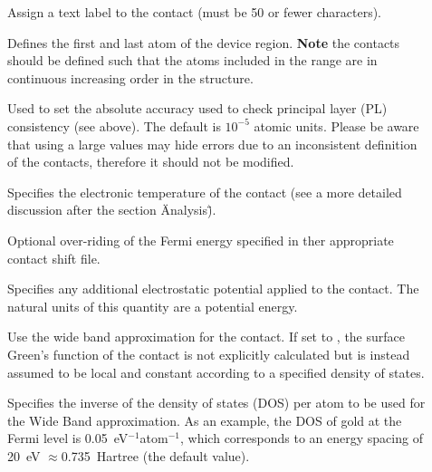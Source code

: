 \begin{description}
\item[] Assign a text label to the contact (must be 50 or fewer
  characters).
\item[]  Defines the first and last atom of the
  device region.  {\bf Note} the contacts should be defined such that the atoms
  included in the range are in continuous increasing order in the structure.
\item[] Used to set the absolute
  accuracy used to check principal layer (PL) consistency (see above). The
  default is $10^{-5}$ atomic units. Please be aware that using a large values
  may hide errors due to an inconsistent definition of the contacts, therefore
  it should not be modified.
\item[] Specifies the electronic
  temperature of the contact (see a more detailed discussion after the section 
  \"Analysis\").
\item[] Optional over-riding of the Fermi
  energy specified in ther appropriate contact shift file.
\item[] Specifies any additional
  electrostatic potential applied to the contact. The natural units of this
  quantity are a potential energy.
\item[] Use the wide band approximation for the contact. If set to
  , the surface Green's function of the contact is not explicitly
  calculated but is instead assumed to be local and constant according to a
  specified density of states.
\item[] Specifies the inverse of the
  density of states (DOS) per atom to be used for the Wide Band
  approximation. As an example, the DOS of gold at the Fermi level is
  0.05~eV$^{-1}$atom$^{-1}$, which corresponds to an energy spacing of 20~eV
  $\approx$0.735~Hartree (the default value).
\end{description}

